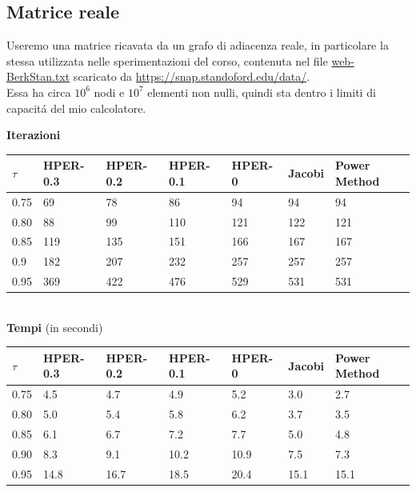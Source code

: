 \documentclass[12pt,a4paper]{amsart}
\numberwithin{equation}{section}
\theoremstyle{plain}
\theoremstyle{definition}
\begin{document}
\subsection{Matrice reale}
Useremo una matrice ricavata da un grafo di adiacenza reale, in particolare la stessa utilizzata nelle sperimentazioni del corso, contenuta nel file \url{web-BerkStan.txt} scaricato da \url{https://snap.standoford.edu/data/}.\\Essa ha circa $10^6$ nodi e $10^7$ elementi non nulli, quindi sta dentro i limiti di capacit\'a del mio calcolatore.\\
\begin{center}
\textbf{Iterazioni}\\
\begin{tabular}{| l | l | l | l | l | l | l |}
\hline
    $\tau$ & HPER-0.3 & HPER-0.2 & HPER-0.1 & HPER-0 & Jacobi & Power Method \\
\hline
0.75 &  69  &  78  &  86  &  94  &  94  &  94\\
\hline
 0.80 &   88&    99&   110&   121&   122&   121\\
 \hline
0.85 &   119&   135&   151&   166&   167&   167\\
\hline
 0.9 &  182&   207&   232&   257&   257&   257\\
 \hline
 0.95 & 369&   422&   476&   529&   531&   531\\
    \end{tabular}
\bigskip\\


\textbf{Tempi} (in secondi)
\begin{tabular}{| l | l | l | l | l | l | l |}
\hline
    $\tau$ & HPER-0.3 & HPER-0.2 & HPER-0.1 & HPER-0 & Jacobi & Power Method \\
\hline
   0.75 & 4.5 &   4.7&    4.9&    5.2&    3.0&    2.7\\
\hline
0.80 &  5.0&    5.4&    5.8&    6.2&    3.7&    3.5\\
\hline
0.85 & 6.1&    6.7&    7.2&    7.7&    5.0&    4.8\\
\hline
0.90 & 8.3&    9.1&   10.2&   10.9&    7.5&    7.3\\
\hline
0.95 &  14.8&   16.7&   18.5&   20.4&   15.1&   15.1\\
    \end{tabular}
    
    
\end{center}
\end{document}
